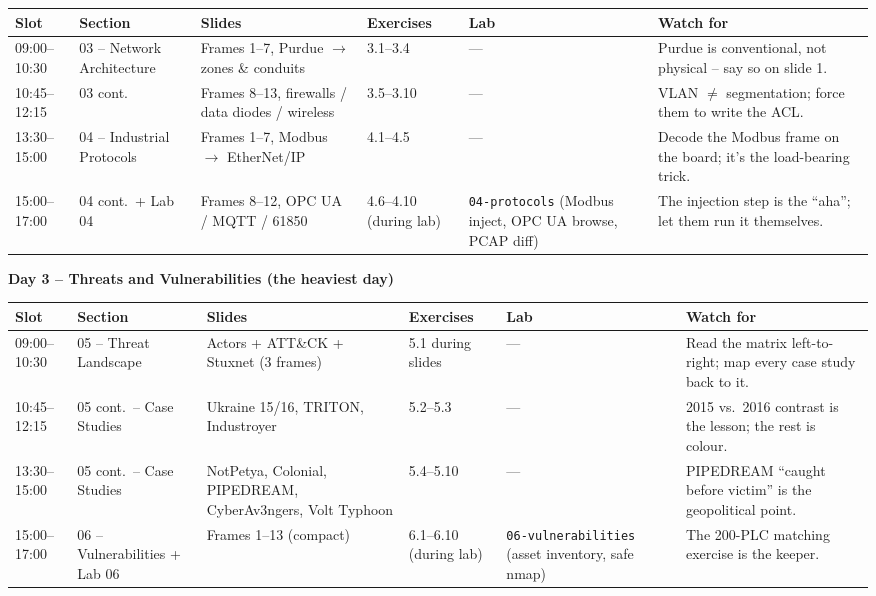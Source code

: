 \documentclass[10pt,a4paper,landscape]{article}
\newcommand{\sectionheader}[1]{%
  \noindent\colorbox{slideBlue}{\parbox{\dimexpr\textwidth-2\fboxsep}{%
    \color{white}\textbf{#1}}}\vspace{1mm}\par%
}
\begin{document}
\begin{tabular}{|p{2.2cm}|p{4.0cm}|p{4.2cm}|p{4.0cm}|p{4.8cm}|p{4.0cm}|}
\hline
\rowcolor{slidePanel}
\textbf{Slot} & \textbf{Section} & \textbf{Slides} & \textbf{Exercises} & \textbf{Lab} & \textbf{Watch for} \\
\hline
09:00--10:30 & 03 -- Network Architecture & Frames 1--7, Purdue $\to$ zones \& conduits & 3.1--3.4 & --- & Purdue is conventional, not physical -- say so on slide 1. \\
\hline
10:45--12:15 & 03 cont. & Frames 8--13, firewalls / data diodes / wireless & 3.5--3.10 & --- & VLAN $\neq$ segmentation; force them to write the ACL. \\
\hline
13:30--15:00 & 04 -- Industrial Protocols & Frames 1--7, Modbus $\to$ EtherNet/IP & 4.1--4.5 & --- & Decode the Modbus frame on the board; it's the load-bearing trick. \\
\hline
15:00--17:00 & 04 cont.\ + Lab 04 & Frames 8--12, OPC UA / MQTT / 61850 & 4.6--4.10 (during lab) & \texttt{04-protocols} (Modbus inject, OPC UA browse, PCAP diff) & The injection step is the ``aha''; let them run it themselves. \\
\hline
\end{tabular}

\vspace{4mm}

\sectionheader{Day 3 -- Threats and Vulnerabilities (the heaviest day)}

\begin{tabular}{|p{2.2cm}|p{4.0cm}|p{4.2cm}|p{4.0cm}|p{4.8cm}|p{4.0cm}|}
\hline
\rowcolor{slidePanel}
\textbf{Slot} & \textbf{Section} & \textbf{Slides} & \textbf{Exercises} & \textbf{Lab} & \textbf{Watch for} \\
\hline
09:00--10:30 & 05 -- Threat Landscape & Actors + ATT\&CK + Stuxnet (3 frames) & 5.1 during slides & --- & Read the matrix left-to-right; map every case study back to it. \\
\hline
10:45--12:15 & 05 cont.\ -- Case Studies & Ukraine 15/16, TRITON, Industroyer & 5.2--5.3 & --- & 2015 vs.\ 2016 contrast is the lesson; the rest is colour. \\
\hline
13:30--15:00 & 05 cont.\ -- Case Studies & NotPetya, Colonial, PIPEDREAM, CyberAv3ngers, Volt Typhoon & 5.4--5.10 & --- & PIPEDREAM ``caught before victim'' is the geopolitical point. \\
\hline
15:00--17:00 & 06 -- Vulnerabilities + Lab 06 & Frames 1--13 (compact) & 6.1--6.10 (during lab) & \texttt{06-vulnerabilities} (asset inventory, safe nmap) & The 200-PLC matching exercise is the keeper. \\
\hline
\end{tabular}
\end{document}
